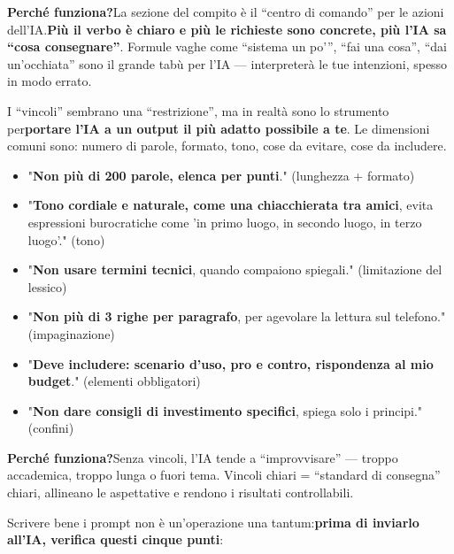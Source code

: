 \textbf{Perché funziona?}La sezione del compito è il “centro di comando” per le azioni dell'IA.\textbf{Più il verbo è chiaro e più le richieste sono concrete, più l'IA sa “cosa consegnare”}. Formule vaghe come “sistema un po'”, “fai una cosa”, “dai un'occhiata” sono il grande tabù per l'IA — interpreterà le tue intenzioni, spesso in modo errato.


I “vincoli” sembrano una “restrizione”, ma in realtà sono lo strumento per\textbf{portare l'IA a un output il più adatto possibile a te}. Le dimensioni comuni sono: numero di parole, formato, tono, cose da evitare, cose da includere.


\begin{itemize}
  \item "\textbf{Non più di 200 parole, elenca per punti}." (lunghezza + formato)
  \item "\textbf{Tono cordiale e naturale, come una chiacchierata tra amici}, evita espressioni burocratiche come 'in primo luogo, in secondo luogo, in terzo luogo'." (tono)
  \item "\textbf{Non usare termini tecnici}, quando compaiono spiegali." (limitazione del lessico)
  \item "\textbf{Non più di 3 righe per paragrafo}, per agevolare la lettura sul telefono." (impaginazione)
  \item "\textbf{Deve includere: scenario d'uso, pro e contro, rispondenza al mio budget}." (elementi obbligatori)
  \item "\textbf{Non dare consigli di investimento specifici}, spiega solo i principi." (confini)
\end{itemize}

\textbf{Perché funziona?}Senza vincoli, l'IA tende a “improvvisare” — troppo accademica, troppo lunga o fuori tema. Vincoli chiari = “standard di consegna” chiari, allineano le aspettative e rendono i risultati controllabili.


Scrivere bene i prompt non è un'operazione una tantum:\textbf{prima di inviarlo all'IA, verifica questi cinque punti}:

